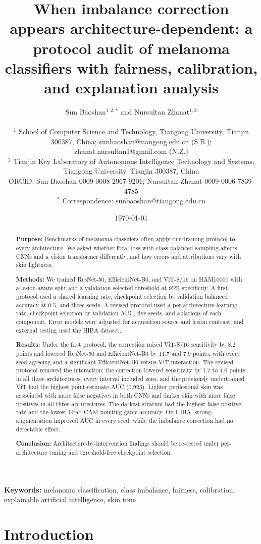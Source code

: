 \documentclass[11pt]{article}
\title{When imbalance correction appears architecture-dependent: a protocol audit of melanoma classifiers with fairness, calibration, and explanation analysis}
\author{
  Sun Baoshan$^{1,2,*}$ and Nursultan Zhanat$^{1,2}$\\[8pt]
  \parbox{0.92\textwidth}{\centering\small
  $^{1}$ School of Computer Science and Technology, Tiangong University, Tianjin 300387, China; sunbaoshan@tiangong.edu.cn (S.B.); zhanat.nursultan1@gmail.com (N.Z.)\\
  $^{2}$ Tianjin Key Laboratory of Autonomous Intelligence Technology and Systems, Tiangong University, Tianjin 300387, China\\
  ORCID: Sun Baoshan 0009-0008-2967-9201; Nursultan Zhanat 0009-0006-7839-4785\\
  $^{*}$ Correspondence: sunbaoshan@tiangong.edu.cn
  }
}
\date{\today}
\begin{document}
\maketitle

\begin{abstract}
\noindent\textbf{Purpose:} Benchmarks of melanoma classifiers often apply one training protocol to every architecture. We asked whether focal loss with class-balanced sampling affects CNNs and a vision transformer differently, and how errors and attributions vary with skin lightness.

\noindent\textbf{Methods:} We trained ResNet-50, EfficientNet-B0, and ViT-S/16 on HAM10000 with a lesion-aware split and a validation-selected threshold at 95\% specificity. A first protocol used a shared learning rate, checkpoint selection by validation balanced accuracy at 0.5, and three seeds. A revised protocol used a per-architecture learning rate, checkpoint selection by validation AUC, five seeds, and ablations of each component. Error models were adjusted for acquisition source and lesion contrast, and external testing used the HIBA dataset.

\noindent\textbf{Results:} Under the first protocol, the correction raised ViT-S/16 sensitivity by 8.2 points and lowered ResNet-50 and EfficientNet-B0 by 11.7 and 7.9 points, with every seed agreeing and a significant EfficientNet-B0 versus ViT interaction. The revised protocol removed the interaction: the correction lowered sensitivity by 1.7 to 4.0 points in all three architectures, every interval included zero, and the previously undertrained ViT had the highest point-estimate AUC (0.923). Lighter perilesional skin was associated with more false negatives in both CNNs and darker skin with more false positives in all three architectures. The darkest stratum had the highest false positive rate and the lowest Grad-CAM pointing-game accuracy. On HIBA, strong augmentation improved AUC in every seed, while the imbalance correction had no detectable effect.

\noindent\textbf{Conclusion:} Architecture-by-intervention findings should be re-tested under per-architecture tuning and threshold-free checkpoint selection.
\end{abstract}

\noindent\textbf{Keywords:} melanoma classification, class imbalance, fairness, calibration, explainable artificial intelligence, skin tone

\section{Introduction}
\end{document}
